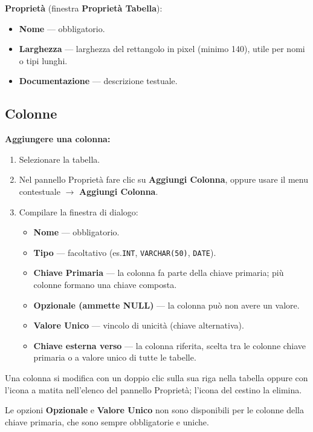 \documentclass[a4paper,11pt]{article}
\newcommand{\uielement}[1]{\textbf{#1}}
\begin{document}
\textbf{Proprietà} (finestra \uielement{Proprietà Tabella}):
\begin{itemize}
  \item \textbf{Nome} --- obbligatorio.
  \item \textbf{Larghezza} --- larghezza del rettangolo in pixel (minimo 140), utile per nomi o
        tipi lunghi.
  \item \textbf{Documentazione} --- descrizione testuale.
\end{itemize}

\subsection{Colonne}

\textbf{Aggiungere una colonna:}
\begin{enumerate}
  \item Selezionare la tabella.
  \item Nel pannello Proprietà fare clic su \uielement{Aggiungi Colonna}, oppure usare il menu
        contestuale $\to$ \uielement{Aggiungi Colonna}.
  \item Compilare la finestra di dialogo:
        \begin{itemize}
          \item \textbf{Nome} --- obbligatorio.
          \item \textbf{Tipo} --- facoltativo (es.\@ \texttt{INT}, \texttt{VARCHAR(50)},
                \texttt{DATE}).
          \item \textbf{Chiave Primaria} --- la colonna fa parte della chiave primaria; più
                colonne formano una chiave composta.
          \item \textbf{Opzionale (ammette NULL)} --- la colonna può non avere un valore.
          \item \textbf{Valore Unico} --- vincolo di unicità (chiave alternativa).
          \item \textbf{Chiave esterna verso} --- la colonna riferita, scelta tra le colonne
                chiave primaria o a valore unico di tutte le tabelle.
        \end{itemize}
\end{enumerate}

Una colonna si modifica con un doppio clic sulla sua riga nella tabella oppure con l'icona a
matita nell'elenco del pannello Proprietà; l'icona del cestino la elimina.

\begin{tcolorbox}[notebox, title={Nota}]
  Le opzioni \textbf{Opzionale} e \textbf{Valore Unico} non sono disponibili per le colonne
  della chiave primaria, che sono sempre obbligatorie e uniche.
\end{tcolorbox}
\end{document}
